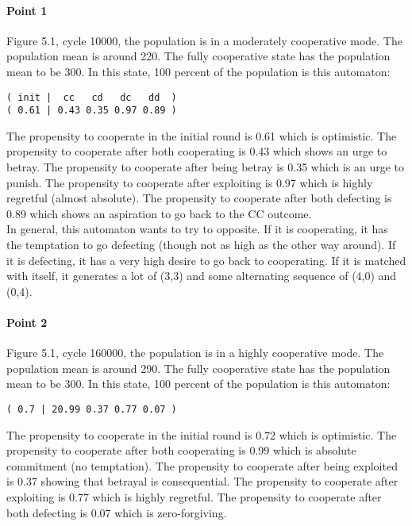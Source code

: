 \documentclass[12.5pt]{report}
\begin{document}
\paragraph{Point 1}

Figure 5.1, cycle 10000, the population is in a moderately cooperative mode. The population mean is around 220. The fully cooperative state has the population mean to be 300. In this state, 100 percent of the population is this automaton:

\begin{verbatim}
( init |  cc   cd   dc   dd  )
( 0.61 | 0.43 0.35 0.97 0.89 )
\end{verbatim}

The propensity to cooperate in the initial round is 0.61 which is optimistic. The propensity to cooperate after both cooperating is 0.43 which shows an urge to betray. The propensity to cooperate after being betray is 0.35 which is an urge to punish. The propensity to cooperate after exploiting is 0.97 which is highly regretful (almost absolute). The propensity to cooperate after both defecting is 0.89 which shows an aspiration to go back to the CC outcome.\\

In general, this automaton wants to try to opposite. If it is cooperating, it has the temptation to go defecting (though not as high as the other way around). If it is defecting, it has a very high desire to go back to cooperating. If it is matched with itself, it generates a lot of (3,3) and some alternating sequence of (4,0) and (0,4).

\paragraph{Point 2}

Figure 5.1, cycle 160000, the population is in a highly cooperative mode. The population mean is around 290. The fully cooperative state has the population mean to be 300. In this state, 100 percent of the population is this automaton:

\begin{verbatim}
( 0.7 | 20.99 0.37 0.77 0.07 )
\end{verbatim}

The propensity to cooperate in the initial round is 0.72 which is optimistic. The propensity to cooperate after both cooperating is 0.99 which is absolute commitment (no temptation). The propensity to cooperate after being exploited is 0.37 showing that betrayal is consequential. The propensity to cooperate after exploiting is 0.77 which is highly regretful. The propensity to cooperate after both defecting is 0.07 which is zero-forgiving.\\
\end{document}
